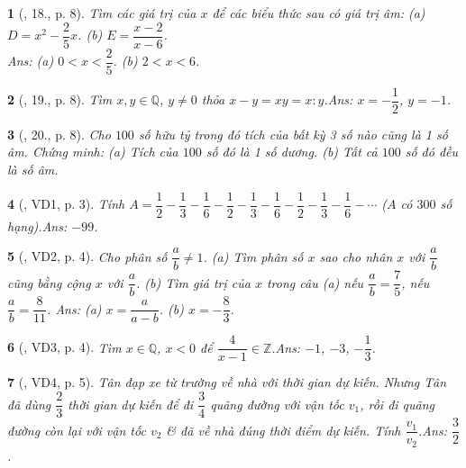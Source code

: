 \documentclass{article}
\newtheorem{baitoan}{}
\begin{document}
\begin{baitoan}[\cite{Tuyen_Toan_7}, 18., p. 8]
	Tìm các giá trị của $x$ để các biểu thức sau có giá trị âm: (a) $D = x^2 - \dfrac{2}{5}x$. (b) $E = \dfrac{x - 2}{x - 6}$.\\\mbox{}\hfill{\sf Ans: (a) $0 < x < \dfrac{2}{5}$. (b) $2 < x < 6$.}
\end{baitoan}

\begin{baitoan}[\cite{Tuyen_Toan_7}, 19., p. 8]
	Tìm $x,y\in\mathbb{Q}$, $y\ne 0$ thỏa $x - y = xy = x:y$.\hfill{\sf Ans: $x = -\dfrac{1}{2}$, $y = -1$.}
\end{baitoan}

\begin{baitoan}[\cite{Tuyen_Toan_7}, 20., p. 8]
	Cho $100$ số hữu tỷ trong đó tích của bất kỳ 3 số nào cũng là 1 số âm. Chứng minh: (a) Tích của $100$ số đó là 1 số dương. (b) Tất cả $100$ số đó đều là số âm.	
\end{baitoan}

\begin{baitoan}[\cite{Binh_Toan_7_tap_1}, VD1, p. 3]
	Tính $A = \dfrac{1}{2} - \dfrac{1}{3} - \dfrac{1}{6} - \dfrac{1}{2} - \dfrac{1}{3} - \dfrac{1}{6} - \dfrac{1}{2} - \dfrac{1}{3} - \dfrac{1}{6} - \cdots$ ($A$ có $300$ số hạng).\hfill{\sf Ans: $-99$.}
\end{baitoan}

\begin{baitoan}[\cite{Binh_Toan_7_tap_1}, VD2, p. 4]
	Cho phân số $\dfrac{a}{b}\ne 1$.	(a) Tìm phân số $x$ sao cho nhân $x$ với $\dfrac{a}{b}$ cũng bằng cộng $x$ với $\dfrac{a}{b}$. (b) Tìm giá trị của $x$ trong câu (a) nếu $\dfrac{a}{b} = \dfrac{7}{5}$, nếu $\dfrac{a}{b} = \dfrac{8}{11}$. \hfill{\sf Ans: (a) $x = \dfrac{a}{a - b}$. (b) $x = -\dfrac{8}{3}$.}
\end{baitoan}

\begin{baitoan}[\cite{Binh_Toan_7_tap_1}, VD3, p. 4]
	Tìm $x\in\mathbb{Q}$, $x < 0$ để $\dfrac{4}{x - 1}\in\mathbb{Z}$.\hfill{\sf Ans: $-1$, $-3$, $-\dfrac{1}{3}$.}
\end{baitoan}

\begin{baitoan}[\cite{Binh_Toan_7_tap_1}, VD4, p. 5]
	Tân đạp xe từ trường về nhà với thời gian dự kiến. Nhưng Tân đã dùng $\dfrac{2}{3}$ thời gian dự kiến để đi $\dfrac{3}{4}$ quãng đường với vận tốc $v_1$, rồi đi quãng đường còn lại với vận tốc $v_2$ \& đã về nhà đúng thời điểm dự kiến. Tính $\dfrac{v_1}{v_2}$.\hfill{\sf Ans: $\dfrac{3}{2}$.}
\end{baitoan}
\end{document}
